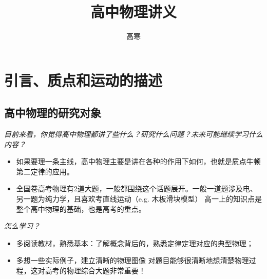 \documentclass[a4paper,9pt]{ctexart}
\title{高中物理讲义}
\author{高寒}
\begin{document}
\maketitle
\tableofcontents
\newpage
\section{引言、质点和运动的描述}
\subsection{高中物理的研究对象}
\emph{目前来看，你觉得高中物理都讲了些什么？研究什么问题？未来可能继续学习什么内容？}
\begin{itemize}
\item
如果要理一条主线，高中物理主要是讲在各种的作用下如何，也就是质点牛顿第二定律的应用。
\item
全国卷高考物理有2道大题，一般都围绕这个话题展开。一般一道题涉及电、另一题为纯力学，且喜欢考直线运动（e.g. 木板滑块模型） \so 高一上的知识点是整个高中物理的基础，也是高考的重点。
\end{itemize}
\emph{怎么学习？}
\begin{itemize}
\item
多阅读教材，熟悉基本：了解概念背后的，熟悉定律定理对应的典型物理；
\item
多想一些实际例子，建立清晰的物理图像 \so 对题目能够很清晰地想清楚物理过程，这对高考的物理综合大题非常重要！
\end{itemize}
\end{document}
